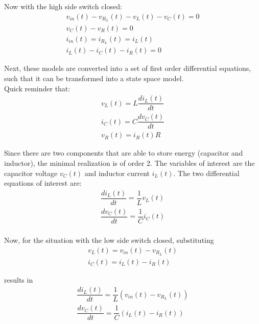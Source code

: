\documentclass[]{article}
\begin{document}
Now with the high side switch closed:
\begin{equation}
	\begin{array}{l}
		v_{in}(t) - v_{R_{L}}(t) - v_{L}(t) - v_{C}(t) = 0 \\
		v_{C}(t) - v_{R}(t) = 0 \\
		i_{in}(t) = i_{R_{L}}(t) = i_{L}(t) \\
		i_{L}(t) - i_{C}(t) - i_{R}(t) = 0 
	\end{array}
\end{equation}

Next, these models are converted into a set of first order differential equations, such that it can be transformed into a state space model. \\

Quick reminder that:
\begin{equation}
	\begin{array}{l}
		v_{L}(t) = L \dfrac{di_{L}(t)}{dt} \\
		i_{C}(t) = C \dfrac{dv_{C}(t)}{dt} \\
		v_{R}(t) = i_{R}(t)R
	\end{array}
\end{equation}

Since there are two components that are able to store energy (capacitor and inductor), the minimal realization is of order 2. The variables of interest are the capacitor voltage $v_{C}(t)$ and inductor current $i_{L}(t)$. The two differential equations of interest are:
\begin{equation}
	\begin{array}{l}
		\dfrac{di_{L}(t)}{dt} = \dfrac{1}{L} v_{L}(t) \\
		\dfrac{dv_{C}(t)}{dt} = \dfrac{1}{C} i_{C}(t) \\
	\end{array}
\end{equation}

Now, for the situation with the low side switch closed, substituting
\begin{equation}
	\begin{array}{l}
		v_{L}(t) = v_{in}(t) - v_{R_{L}}(t) \\
		i_{C}(t) = i_{L}(t) - i_{R}(t) 
	\end{array}
\end{equation}

results in 
\begin{equation}
	\begin{array}{l}
		\dfrac{di_{L}(t)}{dt} = \dfrac{1}{L}(v_{in}(t) - v_{R_{L}}(t)) \\
		\dfrac{dv_{C}(t)}{dt} = \dfrac{1}{C}(i_{L}(t) - i_{R}(t)) \\
	\end{array}
\end{equation}
\end{document}
